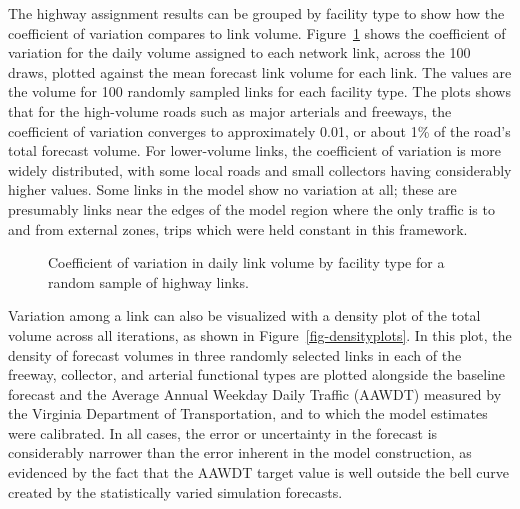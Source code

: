\documentclass[
  letterpaper,
  number,
  review,
  3p]{elsarticle}
\begin{document}
\begin{sidewaysfigure}


\caption{\label{fig-networksd}Standard deviation in daily forecast
volume.}

\end{sidewaysfigure}%

The highway assignment results can be grouped by facility type to show
how the coefficient of variation compares to link volume.
Figure~\ref{fig-totalvolume} shows the coefficient of variation for the
daily volume assigned to each network link, across the 100 draws,
plotted against the mean forecast link volume for each link. The values
are the volume for 100 randomly sampled links for each facility type.
The plots shows that for the high-volume roads such as major arterials
and freeways, the coefficient of variation converges to approximately
0.01, or about 1\% of the road's total forecast volume. For lower-volume
links, the coefficient of variation is more widely distributed, with
some local roads and small collectors having considerably higher values.
Some links in the model show no variation at all; these are presumably
links near the edges of the model region where the only traffic is to
and from external zones, trips which were held constant in this
framework.

\begin{figure}


\caption{\label{fig-totalvolume}Coefficient of variation in daily link
volume by facility type for a random sample of highway links.}

\end{figure}%

Variation among a link can also be visualized with a density plot of the
total volume across all iterations, as shown in
Figure~\ref{fig-densityplots}. In this plot, the density of forecast
volumes in three randomly selected links in each of the freeway,
collector, and arterial functional types are plotted alongside the
baseline forecast and the Average Annual Weekday Daily Traffic (AAWDT)
measured by the Virginia Department of Transportation, and to which the
model estimates were calibrated. In all cases, the error or uncertainty
in the forecast is considerably narrower than the error inherent in the
model construction, as evidenced by the fact that the AAWDT target value
is well outside the bell curve created by the statistically varied
simulation forecasts.
\end{document}
